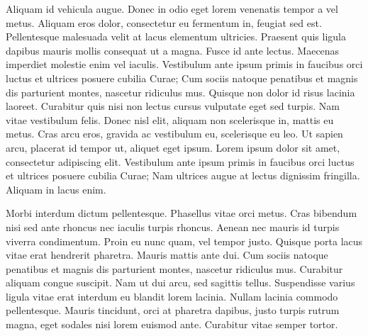 \documentclass[11pt, a4paper]{report}
\begin{document}
Aliquam id vehicula augue. Donec in odio eget lorem venenatis tempor a vel metus. Aliquam eros dolor, consectetur eu fermentum in, feugiat sed est. Pellentesque malesuada velit at lacus elementum ultricies. Praesent quis ligula dapibus mauris mollis consequat ut a magna. Fusce id ante lectus. Maecenas imperdiet molestie enim vel iaculis. Vestibulum ante ipsum primis in faucibus orci luctus et ultrices posuere cubilia Curae; Cum sociis natoque penatibus et magnis dis parturient montes, nascetur ridiculus mus. Quisque non dolor id risus lacinia laoreet. Curabitur quis nisi non lectus cursus vulputate eget sed turpis. Nam vitae vestibulum felis. Donec nisl elit, aliquam non scelerisque in, mattis eu metus. Cras arcu eros, gravida ac vestibulum eu, scelerisque eu leo. Ut sapien arcu, placerat id tempor ut, aliquet eget ipsum. Lorem ipsum dolor sit amet, consectetur adipiscing elit. Vestibulum ante ipsum primis in faucibus orci luctus et ultrices posuere cubilia Curae; Nam ultrices augue at lectus dignissim fringilla. Aliquam in lacus enim.

Morbi interdum dictum pellentesque. Phasellus vitae orci metus. Cras bibendum nisi sed ante rhoncus nec iaculis turpis rhoncus. Aenean nec mauris id turpis viverra condimentum. Proin eu nunc quam, vel tempor justo. Quisque porta lacus vitae erat hendrerit pharetra. Mauris mattis ante dui. Cum sociis natoque penatibus et magnis dis parturient montes, nascetur ridiculus mus. Curabitur aliquam congue suscipit. Nam ut dui arcu, sed sagittis tellus. Suspendisse varius ligula vitae erat interdum eu blandit lorem lacinia. Nullam lacinia commodo pellentesque. Mauris tincidunt, orci at pharetra dapibus, justo turpis rutrum magna, eget sodales nisi lorem euismod ante. Curabitur vitae semper tortor. 
\end{document}
